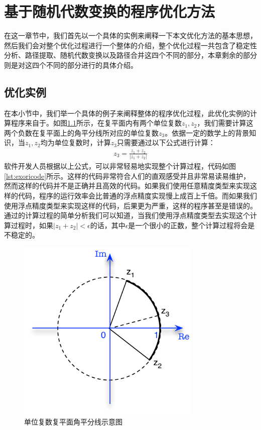 \chapter{基于随机代数变换的程序优化方法}\label{chapter_framework}

在这一章节中，我们首先以一个具体的实例来阐释一下本文优化方法的基本思想，然后我们会对整个优化过程进行一个整体的介绍，整个优化过程一共包含了稳定性分析、路径提取、随机代数变换以及路径合并这四个不同的部分，本章剩余的部分则是对这四个不同的部分进行的具体介绍。

\section{优化实例}
在本小节中，我们举一个具体的例子来阐释整体的程序优化过程，此优化实例的计算程序来自于\cite{doi:10.1137/08074218X}。如图\ref{fig:midarc}所示，在复平面内有两个单位复数$z_1,z_2$，我们需要计算这两个负数在复平面上的角平分线所对应的单位复数$z_3$。依据一定的数学上的背景知识，当$z_1,z_2$均为单位复数时，计算$z_3$只需要通过以下公式进行计算：
\begin{gather*}\label{eq:fpex}
    z_3=\frac{z_1+z_2}{\left|z_1+z_2\right|}
\end{gather*}
软件开发人员根据以上公式，可以非常轻易地实现整个计算过程，代码如图\ref{lst:exoricode}所示。这样的代码非常符合人们的直观感受并且非常易读易维护，然而这样的代码并不是正确并且高效的代码。如果我们使用任意精度类型来实现这样的代码，程序的运行效率会比普通的浮点精度实现慢上成百上千倍。而如果我们使用浮点精度类型来实现这样的代码，后果更为严重，这样的程序甚至是错误的。通过的计算过程的简单分析我们可以知道，当我们使用浮点精度类型去实现这个计算过程时，如果$|z_1+z_2| < \epsilon$的话，其中$\epsilon$是一个很小的正数，整个计算过程将会是不稳定的。

\begin{figure}[thbp]
   \centering
   \includegraphics[width=88mm]{fig/ExampleArc_formal.pdf}
   \caption{单位复数复平面角平分线示意图} \label{fig:midarc}
\end{figure}

